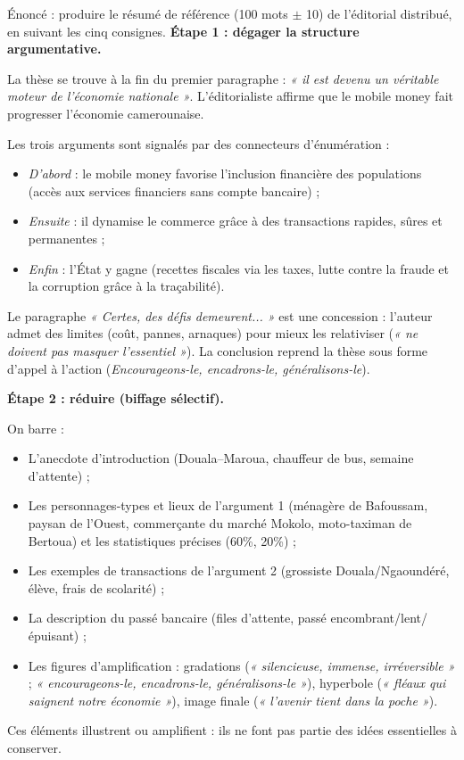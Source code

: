 \documentclass[11pt]{article}
\newcommand{\cle}[1]{{\popxbold\color{popdark}#1}}
\begin{document}
\begin{exoresolu}
Énoncé : produire le résumé de référence (100 mots $\pm$ 10) de l'éditorial distribué, en suivant les cinq consignes.
\tcblower
\textbf{Étape 1 : dégager la structure argumentative.}

La thèse se trouve à la fin du premier paragraphe : \emph{« il est devenu un véritable moteur de l'économie nationale »}. L'éditorialiste affirme que le mobile money fait progresser l'économie camerounaise.

Les trois arguments sont signalés par des connecteurs d'énumération :
\begin{itemize}
\item \emph{D'abord} : le mobile money favorise l'inclusion financière des populations (accès aux services financiers sans compte bancaire) ;
\item \emph{Ensuite} : il dynamise le commerce grâce à des transactions rapides, sûres et permanentes ;
\item \emph{Enfin} : l'État y gagne (recettes fiscales via les taxes, lutte contre la fraude et la corruption grâce à la traçabilité).
\end{itemize}
Le paragraphe \emph{« Certes, des défis demeurent... »} est une \cle{concession} : l'auteur admet des limites (coût, pannes, arnaques) pour mieux les relativiser (\emph{« ne doivent pas masquer l'essentiel »}). La conclusion reprend la thèse sous forme d'appel à l'action (\emph{Encourageons-le, encadrons-le, généralisons-le}).

\textbf{Étape 2 : réduire (biffage sélectif).}

On barre :
\begin{itemize}
\item L'anecdote d'introduction (Douala--Maroua, chauffeur de bus, semaine d'attente) ;
\item Les personnages-types et lieux de l'argument 1 (ménagère de Bafoussam, paysan de l'Ouest, commerçante du marché Mokolo, moto-taximan de Bertoua) et les statistiques précises (60\%, 20\%) ;
\item Les exemples de transactions de l'argument 2 (grossiste Douala/Ngaoundéré, élève, frais de scolarité) ;
\item La description du passé bancaire (files d'attente, passé encombrant/lent/épuisant) ;
\item Les figures d'amplification : gradations (\emph{« silencieuse, immense, irréversible »} ; \emph{« encourageons-le, encadrons-le, généralisons-le »}), hyperbole (\emph{« fléaux qui saignent notre économie »}), image finale (\emph{« l'avenir tient dans la poche »}).
\end{itemize}
Ces éléments illustrent ou amplifient : ils ne font pas partie des idées essentielles à conserver.


\end{exoresolu}
\end{document}
